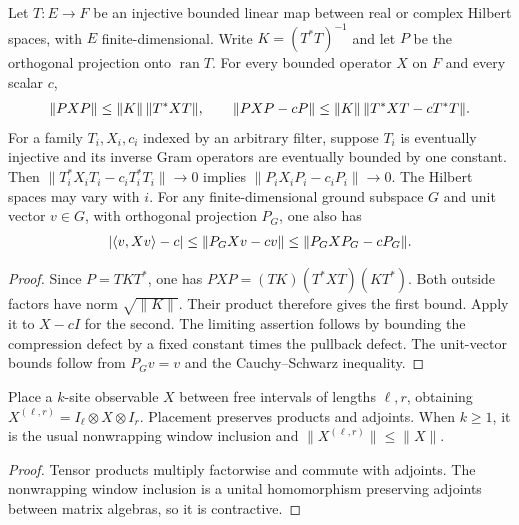 \begin{lemma}
    \label{thm:injective_boundary_compression_norm}
    \leanok
    Let $T:E\to F$ be an injective bounded linear map between real or
    complex Hilbert spaces, with $E$ finite-dimensional. Write
    $K=(T^*T)^{-1}$ and let $P$ be the orthogonal projection onto
    $\operatorname{ran}T$. For every bounded operator $X$ on $F$ and
    every scalar $c$,
    \begin{align}
        \|PXP\|\leq\|K\|\,\|T^*XT\|,
        \qquad
        \|PXP-cP\|\leq\|K\|\,\|T^*XT-cT^*T\|.
        \notag
    \end{align}
    For a family $T_i,X_i,c_i$ indexed by an arbitrary filter, suppose
    $T_i$ is eventually injective and its inverse Gram operators are
    eventually bounded by one constant. Then
    $\|T_i^*X_iT_i-c_iT_i^*T_i\|\to0$ implies
    $\|P_iX_iP_i-c_iP_i\|\to0$. The Hilbert spaces may vary with $i$.
    For any finite-dimensional ground subspace $G$ and unit vector $v\in G$,
    with orthogonal projection $P_G$, one also has
    \begin{align}
        |\langle v,Xv\rangle-c|
        \leq\|P_GXv-cv\|
        \leq\|P_GXP_G-cP_G\|.
        \notag
    \end{align}
\end{lemma}
\begin{proof}\leanok
    Since $P=TKT^*$, one has $PXP=(TK)(T^*XT)(KT^*)$.
    Both outside factors have norm $\sqrt{\|K\|}$. Their product
    therefore gives the first bound. Apply it to $X-cI$ for the second.
    The limiting assertion follows by bounding the compression defect
    by a fixed constant times the pullback defect.
    The unit-vector bounds follow from $P_Gv=v$ and the Cauchy--Schwarz
    inequality.
\end{proof}

\begin{lemma}
    \label{thm:bulk_observable_algebra}
    \leanok
    Place a $k$-site observable $X$ between free intervals of lengths
    $\ell,r$, obtaining $X^{(\ell,r)}=I_\ell\otimes X\otimes I_r$.
    Placement preserves products and adjoints. When $k\geq1$, it is
    the usual nonwrapping window inclusion and
    $\|X^{(\ell,r)}\|\leq\|X\|$.
\end{lemma}
\begin{proof}\leanok
    Tensor products multiply factorwise and commute with adjoints.
    The nonwrapping window inclusion is a unital homomorphism preserving
    adjoints between matrix algebras, so it is contractive.
\end{proof}

